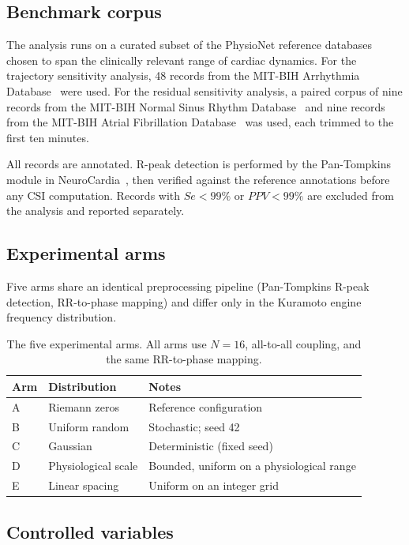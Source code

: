 \documentclass[11pt]{article}
\begin{document}
\subsection{Benchmark corpus}

The analysis runs on a curated subset of the PhysioNet reference
databases chosen to span the clinically relevant range of cardiac
dynamics. For the trajectory sensitivity analysis, 48 records from the
MIT-BIH Arrhythmia Database~\cite{mitdb} were used. For the residual
sensitivity analysis, a paired corpus of nine records from the MIT-BIH
Normal Sinus Rhythm Database~\cite{nsrdb} and nine records from the
MIT-BIH Atrial Fibrillation Database~\cite{afdb} was used, each trimmed
to the first ten minutes.

All records are annotated. R-peak detection is performed by the
Pan-Tompkins module in NeuroCardia~\cite{pan1985}, then verified against
the reference annotations before any CSI computation. Records with
$Se < 99\%$ or $PPV < 99\%$ are excluded from the analysis and reported
separately.

\subsection{Experimental arms}

Five arms share an identical preprocessing pipeline (Pan-Tompkins
R-peak detection, RR-to-phase mapping) and differ only in the Kuramoto
engine frequency distribution.

\begin{table}[h]
\centering
\begin{tabular}{lll}
\toprule
Arm & Distribution & Notes \\
\midrule
A & Riemann zeros & Reference configuration \\
B & Uniform random & Stochastic; seed 42 \\
C & Gaussian & Deterministic (fixed seed) \\
D & Physiological scale & Bounded, uniform on a physiological range \\
E & Linear spacing & Uniform on an integer grid \\
\bottomrule
\end{tabular}
\caption{The five experimental arms. All arms use $N = 16$,
all-to-all coupling, and the same RR-to-phase mapping.}
\label{tab:arms}
\end{table}

\subsection{Controlled variables}
\end{document}
